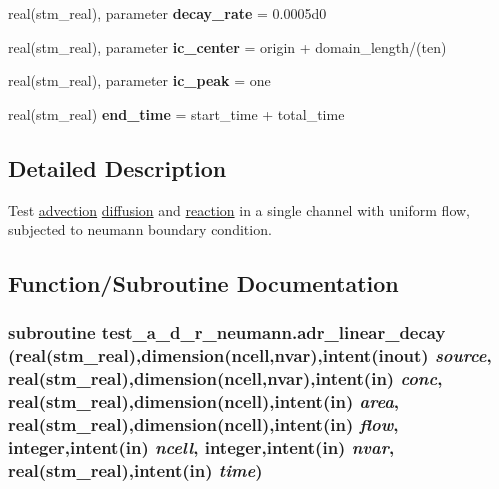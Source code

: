 \begin{CompactItemize}
\item 
\hypertarget{a00073_7a9624c36944428d570f948a1de47033}{
real(stm\_\-real), parameter \textbf{decay\_\-rate} = 0.0005d0}
\label{a00073_7a9624c36944428d570f948a1de47033}

\item 
\hypertarget{a00073_2446c2bb8c3c844642185dff43de167f}{
real(stm\_\-real), parameter \textbf{ic\_\-center} = origin + domain\_\-length/(ten)}
\label{a00073_2446c2bb8c3c844642185dff43de167f}

\item 
\hypertarget{a00073_cdef4891d5f15560128a312b1bf23786}{
real(stm\_\-real), parameter \textbf{ic\_\-peak} = one}
\label{a00073_cdef4891d5f15560128a312b1bf23786}

\item 
\hypertarget{a00073_9715f5cff3bd7d8603c4c412bd19e254}{
real(stm\_\-real) \textbf{end\_\-time} = start\_\-time + total\_\-time}
\label{a00073_9715f5cff3bd7d8603c4c412bd19e254}

\end{CompactItemize}


\subsection{Detailed Description}
Test \hyperlink{a00052}{advection} \hyperlink{a00056}{diffusion} and \hyperlink{a00068}{reaction} in a single channel with uniform flow, subjected to neumann boundary condition. 



\subsection{Function/Subroutine Documentation}
\hypertarget{a00073_933654fc0ee3665286bb1c6530fbf363}{
\subsubsection[{adr\_\-linear\_\-decay}]{\setlength{\rightskip}{0pt plus 5cm}subroutine test\_\-a\_\-d\_\-r\_\-neumann.adr\_\-linear\_\-decay (real(stm\_\-real),dimension(ncell,nvar),intent(inout) {\em source}, \/  real(stm\_\-real),dimension(ncell,nvar),intent(in) {\em conc}, \/  real(stm\_\-real),dimension(ncell),intent(in) {\em area}, \/  real(stm\_\-real),dimension(ncell),intent(in) {\em flow}, \/  integer,intent(in) {\em ncell}, \/  integer,intent(in) {\em nvar}, \/  real(stm\_\-real),intent(in) {\em time})}}
\label{a00073_933654fc0ee3665286bb1c6530fbf363}


